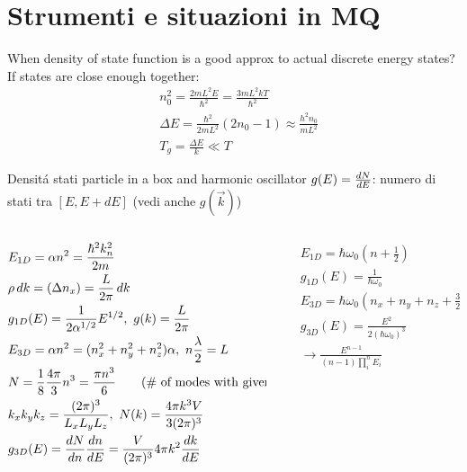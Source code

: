 \section{Strumenti e situazioni in MQ}

\begin{frame}{When density of state function is a good approx to actual discrete energy states?}
If states are close enough together:
\begin{align*}
    &n_0^2=\frac{2mL^2E}{\hbar^2}=\frac{3mL^2kT}{\hbar^2}\tag{Def $n_0$ from thermal energy}\\
    &\Delta E=\frac{\hbar^2}{2mL^2}(2n_0-1)\approx\frac{h^2n_0}{mL^2}\tag{energy level separation}\\
    &T_g=\frac{\Delta E}{k}\ll T
\end{align*}
\end{frame}

\begin{frame}{Densit\'a stati particle in a box and harmonic oscillator}
    $g(E)=\TDy{E}{N}$: numero di stati tra $[E,E+dE]$ (vedi anche $g(\vec{k})$)
\begin{columns}[T]
 \begin{column}{0.55\textwidth}
\begin{align*}
    &E_{1D}=\alpha n^2=\frac{\hbar^2k_n^2}{2m}\\
    &\rho\,dk=(\Delta n_x)=\frac{L}{2\pi}\,dk\\
    &g_{1D}(E)=\frac{1}{2\alpha^{1/2}}E^{1/2},\ g(k)=\frac{L}{2\pi}\\
    &E_{3D}=\alpha n^2=(n_x^2+n_y^2+n_z^2)\alpha,\ n\frac{\lambda}{2}=L\\
    &N=\frac{1}{8}\frac{4\pi}{3}n^3=\frac{\pi n^3}{6}\tag{$\#$ of modes with given E}\\
    &k_xk_yk_z=\frac{(2\pi)^3}{L_xL_yL_z},\ N(k)=\frac{4\pi k^3V}{3(2\pi)^3}\\
    &g_{3D}(E)=\TDy{n}{N}\TDy{E}{n}=\frac{V}{(2\pi)^3}4\pi k^2\TDy{E}{k} 
\end{align*}
 \end{column}
 \begin{column}{0.45\textwidth}
\begin{align*}
    &E_{1D}=\hbar\omega_0(n+\frac{1}{2})\\
    &g_{1D}(E)=\frac{1}{\hbar\omega_0}\\
    &E_{3D}=\hbar\omega_0(n_x+n_y+n_z+\frac{3}{2})\\
    &g_{3D}(E)=\frac{E^2}{2(\hbar\omega_0)^3}\\
    &\to\frac{E^{n-1}}{(n-1)\prod_i^nE_i}
\end{align*}
 \end{column}
 \end{columns}
\end{frame}

